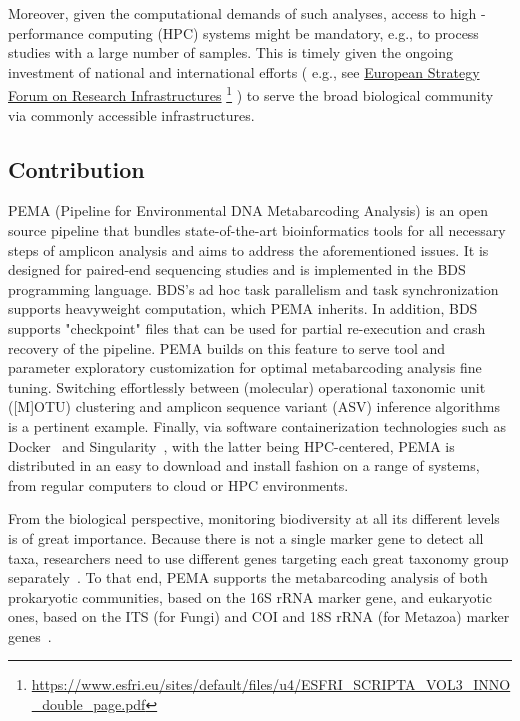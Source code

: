    Moreover, given the computational demands of such analyses, access to high - performance computing (HPC) systems might be mandatory, e.g., to process studies with a large number of samples. 
   This is timely given the ongoing investment of national and international efforts (
   e.g., see 
   \href{https://www.esfri.eu/sites/default/files/u4/ESFRI_SCRIPTA_VOL3_INNO_double_page.pdf}{European Strategy Forum on Research Infrastructures} \footnote{
      \href{https://www.esfri.eu/sites/default/files/u4/ESFRI_SCRIPTA_VOL3_INNO_double_page.pdf}{https://www.esfri.eu/sites/default/files/u4/ESFRI\_SCRIPTA\_VOL3\_INNO\_double\_page.pdf}
   }
   ) 
   to serve the broad biological community via commonly accessible infrastructures.
   
   \subsection{Contribution}

   PEMA (Pipeline for Environmental DNA Metabarcoding Analysis) is an open source pipeline 
   that bundles state-of-the-art bioinformatics tools for all necessary steps of amplicon analysis 
   and aims to address the aforementioned issues. 
   It is designed for paired-end sequencing studies and is implemented in the 
   BDS~\citep{cingolani2015bigdatascript} programming language. 
   BDS's ad hoc task parallelism and task synchronization supports heavyweight computation, 
   which PEMA inherits. 
   In addition, BDS supports "checkpoint" files that can be used for partial re-execution 
   and crash recovery of the pipeline. 
   PEMA builds on this feature to serve tool and parameter exploratory customization 
   for optimal metabarcoding analysis fine tuning.
   Switching effortlessly between (molecular) operational taxonomic unit ([M]OTU) clustering 
   and amplicon sequence variant (ASV) inference algorithms is a pertinent example. 
   Finally, via software containerization technologies such as Docker~\citep{rad2017introduction} 
   and Singularity~\citep{kurtzer2017singularity}, with the latter being HPC-centered, 
   PEMA is distributed in an easy to download and install fashion on a range of systems, 
   from regular computers to cloud or HPC environments.
   
   From the biological perspective, monitoring biodiversity at all its different levels 
   is of great importance. 
   Because there is not a single marker gene to detect all taxa, researchers need to use 
   different genes targeting each great taxonomy group separately~\citep{coissac2012bioinformatic}. 
   To that end, PEMA supports the metabarcoding analysis of both prokaryotic communities, 
   based on the 16S rRNA marker gene, and eukaryotic ones, based on the ITS (for Fungi) 
   and COI and 18S rRNA (for Metazoa) marker genes~\citep{coissac2012bioinformatic}.
   
